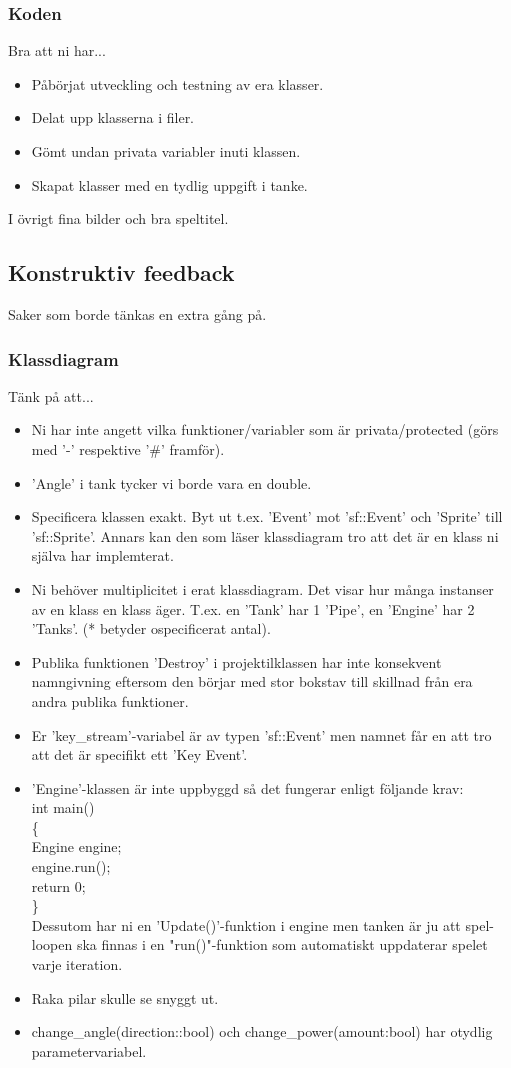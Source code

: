 \documentclass{TDP003mall}
\begin{document}
\subsubsection{Koden}
Bra att ni har...
\begin{itemize}
\item Påbörjat utveckling och testning av era klasser.
\item Delat upp klasserna i filer.
\item Gömt undan privata variabler inuti klassen.
\item Skapat klasser med en tydlig uppgift i tanke.
\end{itemize}
I övrigt fina bilder och bra speltitel.

\newpage

\subsection{Konstruktiv feedback}
Saker som borde tänkas en extra gång på.
\subsubsection{Klassdiagram}
Tänk på att...
\begin{itemize}
\item Ni har inte angett vilka funktioner/variabler som är privata/protected (görs med '-' respektive '\#' framför).
\item 'Angle' i tank tycker vi borde vara en double.
\item Specificera klassen exakt. Byt ut t.ex. 'Event' mot 'sf::Event' och 'Sprite' till 'sf::Sprite'. Annars kan den som läser klassdiagram tro att det är en klass ni själva har implemterat.
\item Ni behöver multiplicitet i erat klassdiagram. Det visar hur många instanser av en klass en klass äger. T.ex. en 'Tank' har 1 'Pipe', en 'Engine' har 2 'Tanks'. (* betyder ospecificerat antal).
\item Publika funktionen 'Destroy' i projektilklassen har inte konsekvent namngivning eftersom den börjar med stor bokstav till skillnad från era andra publika funktioner.
\item Er 'key\_stream'-variabel är av typen 'sf::Event' men namnet får en att tro att det är specifikt ett 'Key Event'.
\item 'Engine'-klassen är inte uppbyggd så det fungerar enligt följande krav: \\
	int main()\\
	\{\\
		Engine engine;\\
		engine.run();\\
		return 0;\\
	\}\\
Dessutom har ni en 'Update()'-funktion i engine men tanken är ju att spel-loopen ska finnas i en "run()"-funktion som automatiskt uppdaterar spelet varje iteration.
\item Raka pilar skulle se snyggt ut.
\item change\_angle(direction::bool) och change\_power(amount:bool) har otydlig parametervariabel.
\end{itemize}
\end{document}
